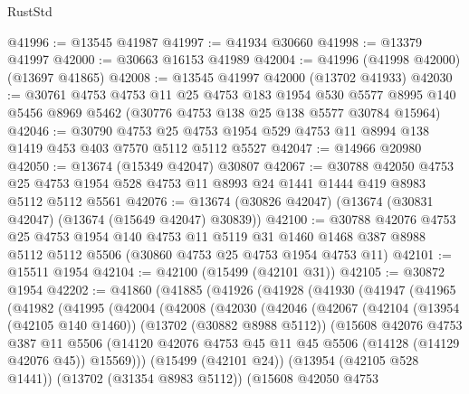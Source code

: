 \begin{lexlean}{RustStd}
\begin{coremodule}
@41996 := @13545 @41987
@41997 := @41934 @30660
@41998 := @13379 @41997
@42000 := @30663 @16153 @41989
@42004 := @41996 (@41998 @42000) (@13697 @41865)
@42008 := @13545 @41997 @42000 (@13702 @41933)
@42030 := @30761
    @4753
    @4753
    @11
    @25
    @4753
    @183
    @1954
    @530
    @5577
    @8995
    @140
    @5456
    @8969
    @5462
    (@30776 @4753 @138 @25 @138 @5577 @30784 @15964)
@42046 := @30790
    @4753
    @25
    @4753
    @1954
    @529
    @4753
    @11
    @8994
    @138
    @1419
    @453
    @403
    @7570
    @5112
    @5112
    @5527
@42047 := @14966 @20980
@42050 := @13674 (@15349 @42047) @30807
@42067 := @30788
    @42050
    @4753
    @25
    @4753
    @1954
    @528
    @4753
    @11
    @8993
    @24
    @1441
    @1444
    @419
    @8983
    @5112
    @5112
    @5561
@42076 := @13674 (@30826 @42047) (@13674 (@30831 @42047) (@13674 (@15649 @42047) @30839))
@42100 := @30788
    @42076
    @4753
    @25
    @4753
    @1954
    @140
    @4753
    @11
    @5119
    @31
    @1460
    @1468
    @387
    @8988
    @5112
    @5112
    @5506
    (@30860 @4753 @25 @4753 @1954 @4753 @11)
@42101 := @15511 @1954
@42104 := @42100 (@15499 (@42101 @31))
@42105 := @30872 @1954
@42202 := @41860
    (@41885
      (@41926
        (@41928
          (@41930
            (@41947
              (@41965
                (@41982
                  (@41995
                    (@42004
                      (@42008
                        (@42030
                          (@42046
                            (@42067
                              (@42104
                                (@13954 (@42105 @140 @1460))
                                (@13702 (@30882 @8988 @5112))
                                (@15608
                                  @42076
                                  @4753
                                  @387
                                  @11
                                  @5506
                                  (@14120
                                    @42076
                                    @4753
                                    @45
                                    @11
                                    @45
                                    @5506
                                    (@14128 (@14129 @42076 @45))
                                    @15569)))
                              (@15499 (@42101 @24))
                              (@13954 (@42105 @528 @1441))
                              (@13702 (@31354 @8983 @5112))
                              (@15608
                                @42050
                                @4753

\end{coremodule}
\end{lexlean}
